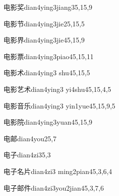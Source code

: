 \begin{entry}{电影奖}{dian4ying3jiang3}{5,15,9}
\end{entry}

\begin{entry}{电影节}{dian4ying3jie2}{5,15,5}
\end{entry}

\begin{entry}{电影界}{dian4ying3jie4}{5,15,9}
\end{entry}

\begin{entry}{电影票}{dian4ying3piao4}{5,15,11}
\end{entry}

\begin{entry}{电影术}{dian4ying3 shu4}{5,15,5}
\end{entry}

\begin{entry}{电影艺术}{dian4ying3 yi4shu4}{5,15,4,5}
\end{entry}

\begin{entry}{电影音乐}{dian4ying3 yin1yue4}{5,15,9,5}
\end{entry}

\begin{entry}{电影院}{dian4ying3yuan4}{5,15,9}
\end{entry}

\begin{entry}{电邮}{dian4you2}{5,7}
\end{entry}

\begin{entry}{电子}{dian4zi3}{5,3}
\end{entry}

\begin{entry}{电子名片}{dian4zi3 ming2pian4}{5,3,6,4}
\end{entry}

\begin{entry}{电子邮件}{dian4zi3you2jian4}{5,3,7,6}
\end{entry}

